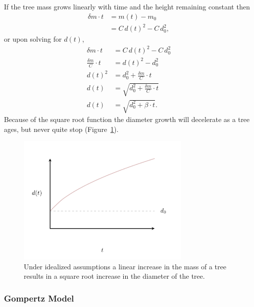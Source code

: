 \documentclass[
  letterpaper,
  DIV=11,
  numbers=noendperiod]{scrartcl}
\begin{document}
If the tree mass grows linearly with time and the height remaining
constant then \begin{align*}
\delta m \cdot t
&=
m(t) - m_{0}
\\
&=
C \, d(t)^{2} - C \, d_{0}^{2},
\end{align*} or upon solving for \(d(t)\), \begin{align*}
\delta m \cdot t
&=
C \, d(t)^{2} - C \, d_{0}^{2}
\\
\frac{\delta m}{C} \cdot t
&=
d(t)^{2} - d_{0}^{2}
\\
d(t)^{2}
&=
d_{0}^{2} + \frac{\delta m}{C} \cdot t
\\
d(t)
&=
\sqrt{ d_{0}^{2} + \frac{\delta m}{C} \cdot t }
\\
d(t)
&=
\sqrt{ d_{0}^{2} + \beta \cdot t }.
\end{align*} Because of the square root function the diameter growth
will decelerate as a tree ages, but never quite stop
(Figure~\ref{fig-square-root}).

\begin{figure}

{\centering \includegraphics[width=0.75\textwidth,height=\textheight]{figures/growth/square_root/square_root.pdf}

}

\caption{\label{fig-square-root}Under idealized assumptions a linear
increase in the mass of a tree results in a square root increase in the
diameter of the tree.}

\end{figure}

\hypertarget{gompertz-model}{%
\subsubsection{Gompertz Model}\label{gompertz-model}}
\end{document}
